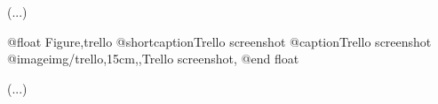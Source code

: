 (...)

@float Figure,trello
@shortcaption{Trello screenshot}
@caption{Trello screenshot}
@image{img/trello,15cm,,Trello screenshot,}
@end float

(...)
